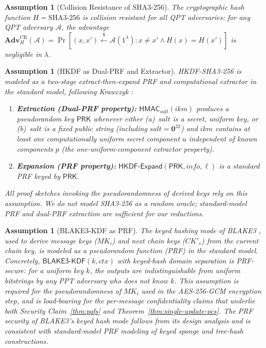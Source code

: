 \documentclass[11pt,a4paper]{article}
\theoremstyle{remark}
\theoremstyle{plain}
\newtheorem{assumption}[theorem]{Assumption}
\newcommand{\Adv}{\mathbf{Adv}}
\newcommand{\calA}{\mathcal{A}}
\newcommand{\getsr}{\stackrel{\$}{\leftarrow}}
\begin{document}
\begin{assumption}[Collision Resistance of SHA3-256]
\label{asm:cr}
The cryptographic hash function $H = \mathrm{SHA3\text{-}256}$ is collision resistant for all QPT adversaries: for any QPT adversary $\calA$, the advantage $\Adv_{H}^{\mathrm{CR}}(\calA) = \Pr[(x, x') \getsr \calA(1^\lambda) : x \neq x' \land H(x) = H(x')]$ is negligible in $\lambda$.
\end{assumption}

\begin{assumption}[HKDF as Dual-PRF and Extractor]
\label{asm:hkdf}
HKDF-SHA3-256 is modeled as a two-stage extract-then-expand PRF and computational extractor
in the standard model, following Krawczyk \cite{krawczyk2010hkdf}:
\begin{enumerate}
  \item \textbf{Extraction (Dual-PRF property):} $\mathsf{HMAC}_{salt}(ikm)$ produces a pseudorandom
        key $\mathsf{PRK}$ whenever either (a)~$salt$ is a secret, uniform key, or (b)~$salt$ is a fixed
        public string (including $salt = \mathbf{0}^{32}$) and $ikm$ contains at least one computationally
        uniform secret component $u$ independent of known components $p$ (the one-uniform-component
        extractor property).
  \item \textbf{Expansion (PRF property):} $\mathsf{HKDF\text{-}Expand}(\mathsf{PRK}, info, \ell)$ is a
        standard PRF keyed by $\mathsf{PRK}$.
\end{enumerate}
All proof sketches invoking the pseudorandomness of derived keys rely on this assumption.  We do
\emph{not} model SHA3-256 as a random oracle; standard-model PRF and dual-PRF extraction are sufficient
for our reductions.
\end{assumption}

\begin{assumption}[BLAKE3-KDF as PRF]
\label{asm:blake3}
The keyed hashing mode of BLAKE3 \cite{blake3}, used to derive message keys ($MK_i$) and
next chain keys ($CK'_s$) from the current chain key, is modeled as a pseudorandom function
(PRF) in the standard model.  Concretely, $\mathsf{BLAKE3\text{-}KDF}(k, \mathit{ctx})$ with
keyed-hash domain separation is PRF-secure: for a uniform key $k$, the outputs are
indistinguishable from uniform bitstrings by any PPT adversary who does not know $k$.
This assumption is required for the pseudorandomness of $MK_i$ used in the AES-256-GCM
encryption step, and is load-bearing for the per-message confidentiality claims that underlie
both Security Claim~\ref{thm:pqfs} and Theorem~\ref{thm:single-update-pcs}.  The PRF security of
BLAKE3's keyed hash mode follows from its design analysis \cite{blake3} and is consistent
with standard-model PRF modeling of keyed sponge and tree-hash constructions.
\end{assumption}
\end{document}
